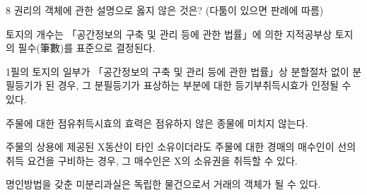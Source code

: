 \begin{question}{8}
권리의 객체에 관한 설명으로 옳지 않은 것은? (다툼이 있으면 판례에 따름)
\begin{choices}
  \item 토지의 개수는 「공간정보의 구축 및 관리 등에 관한 법률」에 의한 지적공부상 토지의 필수(筆數)를 표준으로 결정된다.
  \item 1필의 토지의 일부가 「공간정보의 구축 및 관리 등에 관한 법률」상 분할절차 없이 분필등기가 된 경우, 그 분필등기가 표상하는 부분에 대한 등기부취득시효가 인정될 수 있다.
  \item 주물에 대한 점유취득시효의 효력은 점유하지 않은 종물에 미치지 않는다.
  \item 주물의 상용에 제공된 X동산이 타인 소유이더라도 주물에 대한 경매의 매수인이 선의취득 요건을 구비하는 경우, 그 매수인은 X의 소유권을 취득할 수 있다.
  \item 명인방법을 갖춘 미분리과실은 독립한 물건으로서 거래의 객체가 될 수 있다.
\end{choices}
\end{question}
